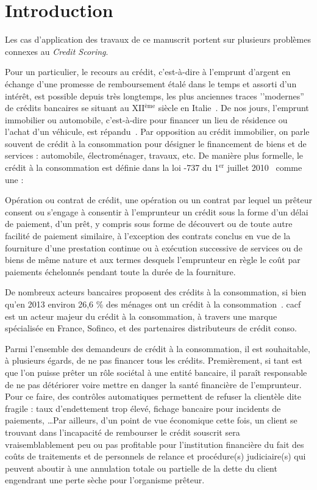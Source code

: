 \chapter*{Introduction} \label{chap_intro}

Les cas d'application des travaux de ce manuscrit portent sur plusieurs problèmes connexes au \textit{Credit Scoring}.

Pour un particulier, le recours au crédit, c'est-à-dire à l'emprunt d'argent en échange d'une promesse de remboursement étalé dans le temps et assorti d'un intérêt, est possible depuis très longtemps, les plus anciennes traces ’’modernes'' de crédits bancaires se situant au XII$^\text{ème}$ siècle en Italie~\cite{thomas_wards_1828}. De nos jours, l'emprunt immobilier ou automobile, c'est-à-dire pour financer un lieu de résidence ou l'achat d'un véhicule, est répandu~\cite{la_tribune_2010}. Par opposition au crédit immobilier, on parle souvent de crédit à la consommation pour désigner le financement de biens et de services : automobile, électroménager, travaux, etc. De manière plus formelle, le crédit à la consommation est définie dans la loi -737 du 1$^\text{er}$ juillet 2010~\cite{noauthor_loi_2010} comme une :
\begin{displayquote}
Opération ou contrat de crédit, une opération ou un contrat par lequel un prêteur consent ou s’engage à consentir à l’emprunteur un crédit sous la forme d’un délai de paiement, d’un prêt, y compris sous forme de découvert ou de toute autre facilité de paiement similaire, à l’exception des contrats conclus en vue de la fourniture d’une prestation continue ou à exécution successive de services ou de biens de même nature et aux termes desquels l’emprunteur en règle le coût par paiements échelonnés pendant toute la durée de la fourniture.
\end{displayquote}

De nombreux acteurs bancaires proposent des crédits à la consommation, si bien qu'en 2013 environ 26,6 \% des ménages ont un crédit à la consommation~\cite{}. \gls{cacf} est un acteur majeur du crédit à la consommation, à travers une marque spécialisée en France, Sofinco, et des partenaires distributeurs de crédit conso.

Parmi l'ensemble des demandeurs de crédit à la consommation, il est souhaitable, à plusieurs égards, de ne pas financer tous les crédits. Premièrement, si tant est que l'on puisse prêter un rôle sociétal à une entité bancaire, il paraît responsable de ne pas détériorer voire mettre en danger la santé financière de l'emprunteur. Pour ce faire, des contrôles automatiques permettent de refuser la clientèle dite fragile : taux d'endettement trop élevé, fichage bancaire pour incidents de paiements, \ldots Par ailleurs, d'un point de vue économique cette fois, un client se trouvant dans l'incapacité de rembourser le crédit souscrit sera vraisemblablement peu ou pas profitable pour l'institution financière du fait des coûts de traitements et de personnels de relance et procédure(s) judiciaire(s) qui peuvent aboutir à une annulation totale ou partielle de la dette du client engendrant une perte sèche pour l'organisme prêteur.

